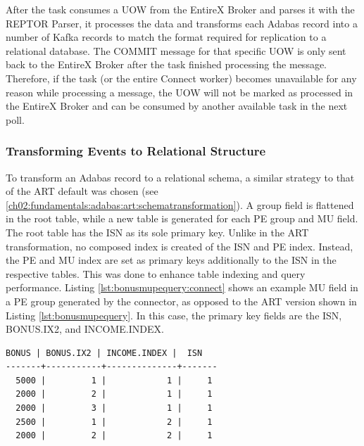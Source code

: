 After the task consumes a \ac{UOW} from the EntireX Broker and parses it with the \ac{REPTOR} Parser, it processes the data and transforms each Adabas record into a number of Kafka records to match the format required for replication to a relational database. The COMMIT message for that specific \ac{UOW} is only sent back to the EntireX Broker after the task finished processing the message. Therefore, if the task (or the entire Connect worker) becomes unavailable for any reason while processing a message, the \ac{UOW} will not be marked as processed in the EntireX Broker and can be consumed by another available task in the next poll.

\subsubsection{Transforming Events to Relational Structure}
\label{ch04:pipelinedevelopment:implementation:transformingtorelational}
To transform an Adabas record to a relational schema, a similar strategy to that of the \ac{ART} default was chosen (see \ref{ch02:fundamentals:adabas:art:schematransformation}). A group field is flattened in the root table, while a new table is generated for each PE group and MU field. The root table has the \ac{ISN} as its sole primary key. Unlike in the \ac{ART} transformation, no composed index is created of the \ac{ISN} and PE index. Instead, the PE and MU index are set as primary keys additionally to the \ac{ISN} in the respective tables. This was done to enhance table indexing and query performance. Listing \ref{lst:bonusmupequery:connect} shows an example MU field in a PE group generated by the connector, as opposed to the \ac{ART} version shown in Listing \ref{lst:bonusmupequery}. In this case, the primary key fields are the \ac{ISN}, BONUS.IX2, and INCOME.INDEX.

\begin{lstlisting}[frame=tb,caption={Query result of the MU field BONUS in the PE field INCOME in the relational table employees\_INCOME\_BONUS (Kafka Connect version)},label=lst:bonusmupequery:connect]
 BONUS | BONUS.IX2 | INCOME.INDEX |  ISN
-------+-----------+--------------+-------
  5000 |         1 |            1 |     1
  2000 |         2 |            1 |     1
  2000 |         3 |            1 |     1
  2500 |         1 |            2 |     1
  2000 |         2 |            2 |     1
\end{lstlisting}

